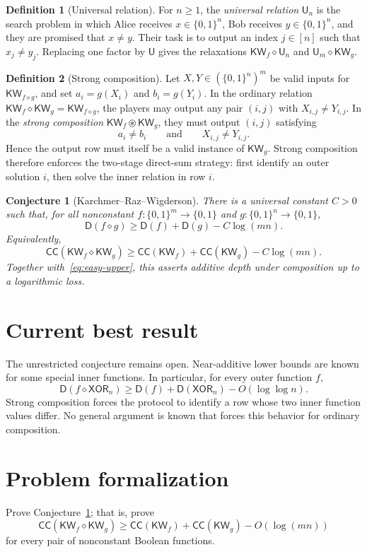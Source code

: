 \documentclass[10pt,a4paper]{article}
\theoremstyle{definition}
\newtheorem{definition}{Definition}
\theoremstyle{plain}
\newtheorem{conjecture}{Conjecture}
\theoremstyle{definition}
\newcommand{\KW}{\mathsf{KW}}
\newcommand{\CC}{\mathsf{CC}}
\newcommand{\Depth}{\mathsf{D}}
\newcommand{\UR}{\mathsf{U}}
\newcommand{\XOR}{\mathsf{XOR}}
\begin{document}
\begin{definition}[Universal relation]
For $n\geq 1$, the \emph{universal relation} $\UR_n$ is the search problem in
which Alice receives $x\in\{0,1\}^n$, Bob receives $y\in\{0,1\}^n$, and they are
promised that $x\neq y$. Their task is to output an index $j\in[n]$ such that
$x_j\neq y_j$. Replacing one factor by $\UR$ gives the relaxations
$\KW_f\diamond\UR_n$ and $\UR_m\diamond\KW_g$.
\end{definition}

\begin{definition}[Strong composition]
Let $X,Y\in(\{0,1\}^n)^m$ be valid inputs for $\KW_{f\diamond g}$, and set
$a_i=g(X_i)$ and $b_i=g(Y_i)$. In the ordinary relation
$\KW_f\diamond\KW_g=\KW_{f\diamond g}$, the players may output any pair $(i,j)$
with $X_{i,j}\neq Y_{i,j}$. In the \emph{strong composition}
$\KW_f\circledast\KW_g$, they must output $(i,j)$ satisfying
\begin{equation}\label{eq:strong-def}
  a_i\neq b_i
  \qquad\text{and}\qquad
  X_{i,j}\neq Y_{i,j}.
\end{equation}
Hence the output row must itself be a valid instance of $\KW_g$. Strong composition
therefore enforces the two-stage direct-sum strategy: first identify an outer solution
$i$, then solve the inner relation in row $i$.
\end{definition}

\begin{conjecture}[Karchmer--Raz--Wigderson]\label{conj:krw}
There is a universal constant $C>0$ such that, for all nonconstant
$f:\{0,1\}^{m}\to\{0,1\}$ and $g:\{0,1\}^{n}\to\{0,1\}$,
\begin{equation}\label{eq:krw}
  \Depth(f\diamond g)
  \geq \Depth(f)+\Depth(g)-C\log(mn).
\end{equation}
Equivalently,
\begin{equation}\label{eq:krw-cc}
  \CC(\KW_f\diamond\KW_g)
  \geq \CC(\KW_f)+\CC(\KW_g)-C\log(mn).
\end{equation}
Together with~\eqref{eq:easy-upper}, this asserts additive depth under composition
up to a logarithmic loss.
\end{conjecture}

\section{Current best result}
The unrestricted conjecture remains open. Near-additive lower bounds are known
for some special inner functions. In particular, for every outer function $f$,
\begin{equation}
  \Depth(f\diamond\XOR_n)
  \geq \Depth(f)+\Depth(\XOR_n)-O(\log\log n).
\end{equation}
Strong composition forces the protocol to identify a row whose two inner
function values differ. No general argument is known that forces this behavior
for ordinary composition.

\section{Problem formalization}
Prove Conjecture~\ref{conj:krw}; that is, prove
\begin{equation}
  \CC(\KW_f\diamond\KW_g)
  \geq \CC(\KW_f)+\CC(\KW_g)-O(\log(mn))
\end{equation}
for every pair of nonconstant Boolean functions. 
\end{document}
